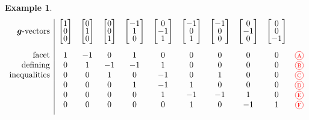 \documentclass{amsart}
\theoremstyle{definition}
\newtheorem{example}[theorem]{Example}
\renewcommand{\b}[1]{{\boldsymbol{#1}}} %
\newcommand{\red}{\color{red}} %
\newcommand*\circled[1]{\tikz[baseline=(char.base)]{\node[shape=circle, draw, inner sep=1.5pt, scale=.7] (char) {#1};}}
\newcommand{\compactVectorT}[3]{\begin{bmatrix} #1 \\[-.1cm] #2 \\[-.1cm] #3 \end{bmatrix}}
\begin{document}
\begin{example}
\[\begin{array}{r|cccccccccc}
\text{$\b{g}$-vectors} & \compactVectorT{1}{0}{0} & \compactVectorT{0}{1}{0} & \compactVectorT{0}{0}{1} & \compactVectorT{-1}{1}{0} & \compactVectorT{0}{-1}{1} & \compactVectorT{-1}{0}{1} & \compactVectorT{-1}{0}{0} & \compactVectorT{0}{-1}{0} & \compactVectorT{0}{0}{-1} \\[.6cm]
\text{facet}		& 1 & -1 & 0 & 1 & 0 & 0 & 0 & 0 & 0 & \red \circled{A} \\
\text{defining} 	& 0 & 1 & -1 & -1 & 1 & 0 & 0 & 0 & 0 & \red \circled{B} \\
\text{inequalities}	& 0 & 0 & 1 & 0 & -1 & 0 & 1 & 0 & 0 & \red \circled{C} \\
					& 0 & 0 & 0 & 1 & -1 & 1 & 0 & 0 & 0 & \red \circled{D} \\
					& 0 & 0 & 0 & 0 & 1 & -1 & -1 & 1 & 0 & \red \circled{E} \\
					& 0 & 0 & 0 & 0 & 0 & 1 & 0 & -1 & 1 & \red \circled{F} \\[.2cm]
\end{array}
\]
\medskip

%
%


\end{example}
\end{document}
